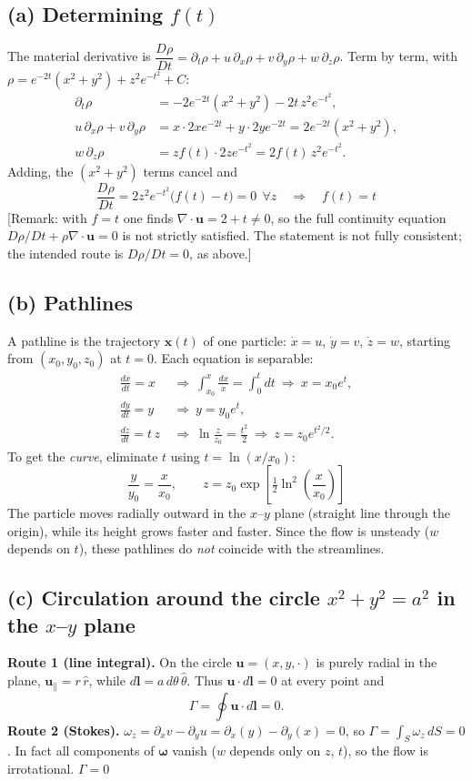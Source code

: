 \documentclass[11pt]{article}
\newcommand{\pd}{\partial}
\newcommand{\bu}{\mathbf u}
\newcommand{\bo}{\boldsymbol\omega}
\newcommand{\why}[1]{{\color{gray}\small[#1]}}
\begin{document}
\subsection*{(a) Determining $f(t)$}
The material derivative is $\dfrac{D\rho}{Dt}=\pd_t\rho+u\,\pd_x\rho+v\,\pd_y\rho+w\,\pd_z\rho$. Term by term, with $\rho=e^{-2t}(x^2+y^2)+z^2e^{-t^2}+C$:
\begin{align*}
\pd_t\rho&=-2e^{-2t}(x^2+y^2)-2t\,z^2e^{-t^2},\\
u\,\pd_x\rho+v\,\pd_y\rho&=x\cdot2xe^{-2t}+y\cdot2ye^{-2t}=2e^{-2t}(x^2+y^2),\\
w\,\pd_z\rho&=z f(t)\cdot2ze^{-t^2}=2f(t)\,z^2e^{-t^2}.
\end{align*}
Adding, the $(x^2+y^2)$ terms cancel and
\[
\frac{D\rho}{Dt}=2z^2e^{-t^2}\big(f(t)-t\big)=0\ \ \forall z
\quad\Longrightarrow\quad \boxed{f(t)=t}
\]
\why{Remark: with $f=t$ one finds $\nabla\!\cdot\bu=2+t\neq0$, so the full continuity equation $D\rho/Dt+\rho\nabla\!\cdot\bu=0$ is not strictly satisfied. The statement is not fully consistent; the intended route is $D\rho/Dt=0$, as above.}

\subsection*{(b) Pathlines}
A pathline is the trajectory $\mathbf x(t)$ of one particle: $\dot x=u$, $\dot y=v$, $\dot z=w$, starting from $(x_0,y_0,z_0)$ at $t=0$. Each equation is separable:
\begin{align*}
\frac{dx}{dt}=x &\ \Rightarrow\ \int_{x_0}^{x}\frac{dx}{x}=\int_0^tdt\ \Rightarrow\ x=x_0e^{t},\\
\frac{dy}{dt}=y &\ \Rightarrow\ y=y_0e^{t},\\
\frac{dz}{dt}=t\,z &\ \Rightarrow\ \ln\frac{z}{z_0}=\frac{t^2}{2}\ \Rightarrow\ z=z_0e^{t^2/2}.
\end{align*}
To get the \emph{curve}, eliminate $t$ using $t=\ln(x/x_0)$:
\[
\boxed{\ \frac{y}{y_0}=\frac{x}{x_0},\qquad z=z_0\exp\!\left[\tfrac12\ln^2\!\left(\frac{x}{x_0}\right)\right]\ }
\]
The particle moves radially outward in the $x$--$y$ plane (straight line through the origin), while its height grows faster and faster. Since the flow is unsteady ($w$ depends on $t$), these pathlines do \emph{not} coincide with the streamlines.

\subsection*{(c) Circulation around the circle $x^2+y^2=a^2$ in the $x$--$y$ plane}
\textbf{Route 1 (line integral).} On the circle $\bu=(x,y,\cdot)$ is purely radial in the plane, $\bu_\parallel=r\,\hat r$, while $d\mathbf l=a\,d\theta\,\hat\theta$. Thus $\bu\cdot d\mathbf l=0$ at every point and
\[
\Gamma=\oint\bu\cdot d\mathbf l=0 .
\]
\textbf{Route 2 (Stokes).} $\omega_z=\pd_xv-\pd_yu=\pd_x(y)-\pd_y(x)=0$, so $\Gamma=\int_S\omega_z\,dS=0$. In fact all components of $\bo$ vanish ($w$ depends only on $z$, $t$), so the flow is irrotational. \quad $\boxed{\Gamma=0}$
\end{document}
